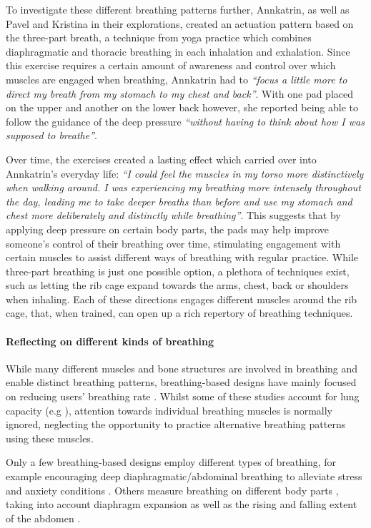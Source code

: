 To investigate these different breathing patterns further, Annkatrin, as well as Pavel and Kristina in their explorations, created an actuation pattern based on the three-part breath, a technique from yoga practice which combines diaphragmatic and thoracic breathing in each inhalation and exhalation. Since this exercise requires a certain amount of awareness and control over which muscles are engaged when breathing, Annkatrin had to \textit{``focus a little more to direct my breath from my stomach to my chest and back''}. With one pad placed on the upper and another on the lower back however, she reported being able to follow the guidance of the deep pressure \textit{``without having to think about how I was supposed to breathe''}.

Over time, the exercises created a lasting effect which carried over into Annkatrin's everyday life: \textit{``I could feel the muscles in my torso more distinctively when walking around. I was experiencing my breathing more intensely throughout the day, leading me to take deeper breaths than before and use my stomach and chest more deliberately and distinctly while breathing''}. This suggests that by applying deep pressure on certain body parts, the pads may help improve someone's control of their breathing over time, stimulating engagement with certain muscles to assist different ways of breathing with regular practice. While three-part breathing is just one possible option, a plethora of techniques exist, such as letting the rib cage expand towards the arms, chest, back or shoulders when inhaling. Each of these directions engages different muscles around the rib cage, that, when trained, can open up a rich repertory of breathing techniques.
%

\paragraph{Reflecting on different kinds of breathing}

While many different muscles and bone structures are involved in breathing and enable distinct breathing patterns, breathing-based designs have mainly focused on reducing users' breathing rate \cite{prpa_inhaling_2020}. Whilst some of these studies account for lung capacity (e.g \cite{abushakra_augmenting_2014}), attention towards individual breathing muscles is normally ignored, neglecting the opportunity to practice alternative breathing patterns using these muscles.

Only a few breathing-based designs employ different types of breathing, for example encouraging deep diaphragmatic/abdominal breathing to alleviate stress \cite{prpa_hacking_2016} and anxiety conditions \cite{van_rooij_deep_2016}. Others measure breathing on different body parts \cite{prpa_attending_2018}, taking into account diaphragm expansion \cite{desnoyers-stewart_jel_2019} as well as the rising and falling extent of the abdomen \cite{schnadelbach_exobuilding:_2012}.


